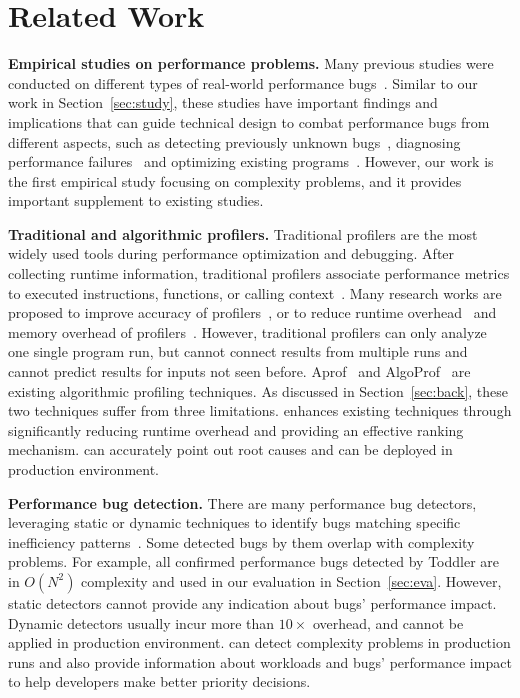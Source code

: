 
\section{Related Work}
\label{sec:related}

\noindent\textbf{Empirical studies on performance problems.}
Many previous studies were conducted on different types 
of real-world performance
bugs~\cite{PerfBug,SongOOPSLA2014,ldoctor,Zaman2012MSR,Nistor2013MSR,HuangRegression,SmartphoneStudy,junwen-1}.
Similar to our work in Section~\ref{sec:study},
these studies have important findings and 
implications 
that can guide technical design to combat
performance bugs from different aspects, 
such as detecting previously unknown bugs~\cite{PerfBug,SmartphoneStudy,junwen-1}, 
diagnosing performance failures~\cite{SongOOPSLA2014,ldoctor} 
and optimizing existing programs~\cite{junwen-2}. 
However, our work is the first empirical study focusing 
on complexity problems,
and it provides important supplement to existing studies.

\noindent\textbf{Traditional and algorithmic profilers.}
Traditional profilers are the most widely used tools
during performance optimization and debugging.
After collecting runtime information,
traditional profilers associate performance metrics to executed instructions,
functions, or calling context~\cite{oprofile,gprof,CCT}.
Many research works are proposed to improve
accuracy of profilers~\cite{4Profilers, LagHunter, AppInsight}, or
to reduce runtime overhead~\cite{AdaptiveBurst}
and memory overhead of profilers~\cite{HotCallingContext}.
However, traditional profilers can only analyze one single program run,
but cannot connect results from multiple runs and cannot
predict results for inputs not seen before.
Aprof~\cite{Aprof1, Aprof2} and AlgoProf~\cite{AlgoProf} are existing
algorithmic profiling techniques.
As discussed in Section~\ref{sec:back},
these two techniques suffer from three limitations. 
\Tool enhances existing techniques through significantly 
reducing runtime overhead and providing an effective ranking mechanism. 
\Tool can accurately point out root causes 
and can be deployed in production environment. 


\noindent\textbf{Performance bug detection.}
There are many performance bug detectors, 
leveraging static or dynamic techniques to
identify bugs matching specific inefficiency
patterns~\cite{yufei-perf,CLARITY,xiao13:context,PerfBug,Alabama,CARAMEL,XuDataStructure,XuBloatPLDI2009,XuBloatPLDI2010,Cachetor,LoopInvariant,falsesharing}.
Some detected bugs by them overlap with complexity problems.
For example, 
all confirmed performance bugs detected by Toddler are 
in $O(N^2)$ complexity and used in our evaluation in Section~\ref{sec:eva}.
However, static detectors cannot provide any indication
about bugs' performance impact.
Dynamic detectors usually incur more than $10\times$ overhead,
and cannot be applied in production environment.
\Tool can detect complexity problems in production runs 
and also provide information about workloads and bugs' performance impact 
to help developers make better priority decisions. 

